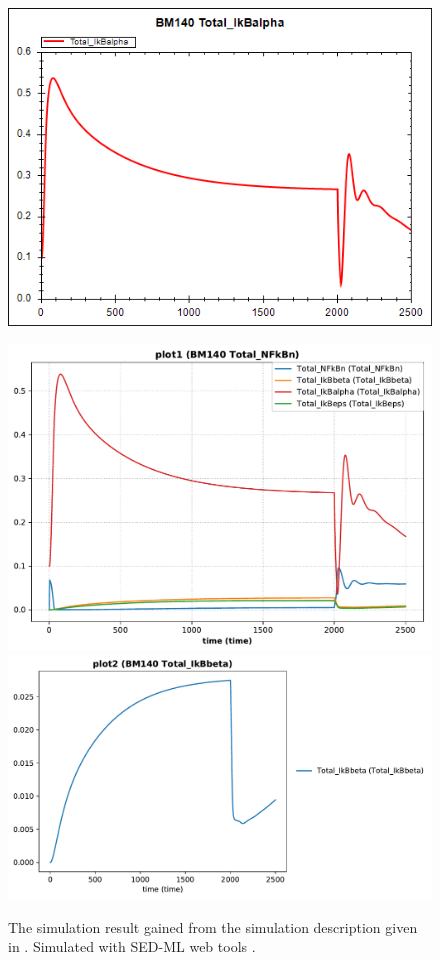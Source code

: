 \begin{figure}[ht]
\begin{minipage}{0.47\textwidth}
		\includegraphics[width=1.0\textwidth]{examples/ikappab/results/sedml_webtools/plot4}
        \caption{The simulation result gained from the simulation description given in . Simulated with SED-ML web tools \citep{bergmann2017sed}.}
    \end{minipage}\hfill
    \begin{minipage}{0.47\textwidth}
        \centering
        \includegraphics[width=1.0\textwidth]{examples/ikappab/results/tellurium/plot1}
		\includegraphics[width=1.0\textwidth]{examples/ikappab/results/tellurium/plot2}

\end{minipage}
\end{figure}
